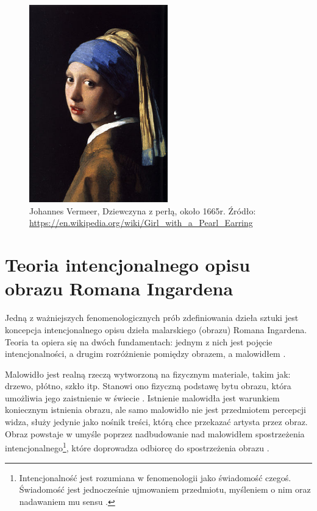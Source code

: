 \documentclass[licencjacka]{kdypl}
\begin{document}
\begin{figure}[H]
\includegraphics[width=6cm]{pearl}
\centering
\caption{Johannes Vermeer, Dziewczyna z perłą, około 1665r. Źródło: \url{https://en.wikipedia.org/wiki/Girl_with_a_Pearl_Earring}}
\end{figure}



\section{Teoria intencjonalnego opisu obrazu Romana Ingardena}

Jedną z ważniejszych fenomenologicznych prób zdefiniowania dzieła sztuki jest koncepcja intencjonalnego opisu dzieła malarskiego (obrazu) Romana Ingardena. Teoria ta opiera się na dwóch fundamentach: jednym z nich jest pojęcie intencjonalności, a  drugim rozróżnienie pomiędzy obrazem, a malowidłem \citep[s. 9]{Ingarden1958}.

Malowidło jest realną rzeczą wytworzoną na fizycznym materiale, takim jak: drzewo, płótno, szkło itp. Stanowi ono fizyczną podstawę bytu obrazu, która umożliwia jego zaistnienie w świecie \citep[s. 68]{Ingarden1958}. Istnienie malowidła jest warunkiem koniecznym istnienia obrazu, ale samo malowidło nie jest przedmiotem percepcji widza, służy jedynie jako nośnik treści, którą chce przekazać artysta przez obraz. Obraz powstaje w umyśle poprzez nadbudowanie nad malowidłem spostrzeżenia intencjonalnego\footnote{Intencjonalność jest rozumiana w fenomenologii jako świadomość czegoś. Świadomość jest jednocześnie ujmowaniem przedmiotu, myśleniem o nim oraz nadawaniem mu sensu \citep{sep-phenomenology}.}, które doprowadza odbiorcę do spostrzeżenia obrazu \citep[s. 70-73]{Ingarden1958}.
\end{document}
